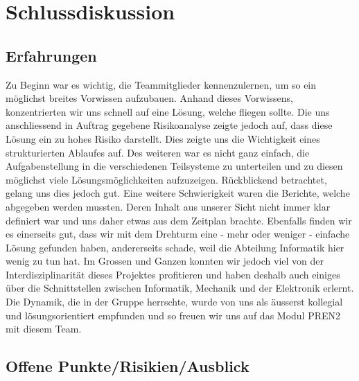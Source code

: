 \section{Schlussdiskussion}

\subsection{Erfahrungen}

Zu Beginn war es wichtig, die Teammitglieder kennenzulernen, um so ein 
möglichst breites Vorwissen aufzubauen. Anhand dieses Vorwissens, 
konzentrierten wir uns schnell auf eine Lösung, welche fliegen sollte. Die uns 
anschliessend in Auftrag gegebene Risikoanalyse zeigte jedoch auf, dass diese 
Lösung ein zu hohes Risiko darstellt. Dies zeigte uns die 
Wichtigkeit eines strukturierten Ablaufes auf. Des weiteren war es nicht ganz 
einfach, die Aufgabenstellung in die verschiedenen Teilsysteme zu unterteilen  
und zu diesen möglichst viele Lösungsmöglichkeiten aufzuzeigen. 
Rückblickend betrachtet, gelang uns dies jedoch gut. Eine weitere 
Schwierigkeit waren die Berichte, welche abgegeben werden mussten. 
Deren Inhalt aus unserer Sicht nicht immer klar definiert war und uns daher 
etwas aus dem Zeitplan brachte.
Ebenfalls finden wir es einerseits gut, dass wir mit dem Drehturm eine - mehr oder weniger - einfache Lösung gefunden haben, andererseits schade, weil die Abteilung Informatik hier wenig zu tun hat. Im Grossen und Ganzen konnten wir jedoch viel 
von der Interdisziplinarität dieses Projektes profitieren und haben deshalb 
auch einiges über die Schnittstellen zwischen Informatik, Mechanik und der Elektronik 
erlernt. Die Dynamik, die in der Gruppe herrschte, wurde von uns als äusserst kollegial und lösungsorientiert empfunden und so freuen wir uns auf das Modul PREN2 mit diesem Team.


\subsection{Offene Punkte/Risikien/Ausblick}

